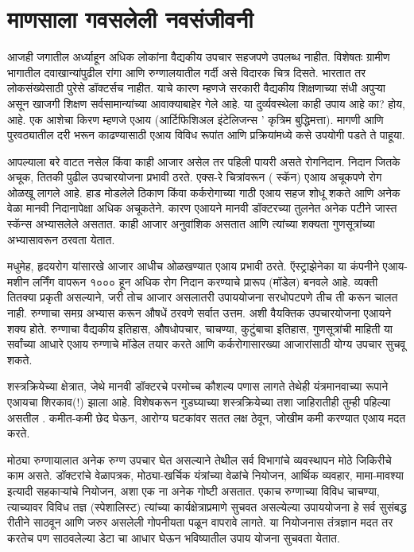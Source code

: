 \chapter{माणसाला गवसलेली नवसंजीवनी}

आजही जगातील अर्ध्याहून अधिक लोकांना वैद्यकीय उपचार सहजपणे उपलब्ध नाहीत. विशेषतः ग्रामीण भागातील दवाखान्यांपुढील रांगा आणि रुग्णालयातील गर्दी असे विदारक चित्र दिसते. भारतात तर लोकसंख्येसाठी पुरेसे डॉक्टर्सच नाहीत. याचे कारण म्हणजे सरकारी वैद्यकीय शिक्षणाच्या संधी अपुऱ्या असून खाजगी शिक्षण सर्वसामान्यांच्या आवाक्याबाहेर गेले आहे. या दुर्व्यवस्थेला काही उपाय आहे का? होय, आहे. एक आशेचा किरण म्हणजे एआय (आर्टिफिशिअल इंटेलिजन्स ' कृत्रिम बुद्धिमत्ता). मागणी आणि पुरवठ्यातील दरी भरून काढण्यासाठी एआय विविध रूपांत आणि प्रक्रियांमध्ये कसे उपयोगी पडते ते पाहूया.

आपल्याला बरे वाटत नसेल किंवा काही आजार असेल तर पहिली पायरी असते रोगनिदान. निदान जितके अचूक, तितकी पुढील उपचारयोजना प्रभावी ठरते. एक्स-रे चित्रांवरून ( स्कॅन) एआय अचूकपणे रोग ओळखू लागले आहे. हाड मोडलेले ठिकाण किंवा कर्करोगाच्या गाठी एआय सहज शोधू शकते आणि अनेक वेळा मानवी निदानापेक्षा अधिक अचूकतेने. कारण एआयने मानवी डॉक्टरच्या तुलनेत अनेक पटीने जास्त स्कॅन्स अभ्यासलेले असतात. काही आजार अनुवांशिक असतात आणि त्यांच्या शक्यता गुणसूत्रांच्या अभ्यासावरून ठरवता येतात.

मधुमेह, हृदयरोग यांसारखे आजार आधीच ओळखण्यात एआय प्रभावी ठरते. ऍस्ट्राझेनेका या कंपनीने एआय-मशीन लर्निंग वापरून १००० हून अधिक रोग निदान करण्याचे प्रारूप (मॉडेल) बनवले आहे. व्यक्ती तितक्या प्रकृती असल्याने, जरी तोच आजार असलातरी उपाययोजना सरधोपटपणे तीच ती करून चालत नाही. रुग्णाचा समग्र अभ्यास करून औषधें ठरवणे सर्वात उत्तम. अशी वैयक्तिक उपचारयोजना एआयने शक्य होते. रुग्णाचा वैद्यकीय इतिहास, औषधोपचार, चाचण्या, कुटुंबाचा इतिहास, गुणसूत्रांची माहिती या सर्वांच्या आधारे एआय रुग्णाचे मॉडेल तयार करते आणि कर्करोगासारख्या आजारांसाठी योग्य उपचार सुचवू शकते.

शस्त्रक्रियेच्या क्षेत्रात, जेथे मानवी डॉक्टरचे परमोच्च कौशल्य पणास लागते तेथेही यंत्रमानवाच्या रूपाने एआयचा शिरकाव(!) झाला आहे. विशेषकरून गुडघ्याच्या शस्त्रक्रियेच्या तशा जाहिरातीही तुम्ही पहिल्या असतील . कमीत-कमी छेद घेऊन, आरोग्य घटकांवर सतत लक्ष ठेवून, जोखीम कमी करण्यात एआय मदत करते.

मोठ्या रुग्णायालात अनेक रुग्ण उपचार घेत असल्याने तेथील सर्व विभागांचे व्यवस्थापन मोठे जिकिरीचे काम असते. डॉक्टरांचे वेळापत्रक, मोठ्या-खर्चिक यंत्रांच्या वेळांचे नियोजन, आर्थिक व्यवहार, मामा-मावश्या इत्यादी सहकाऱ्यांचे नियोजन, अशा एक ना अनेक गोष्टी असतात. एकाच रुग्णाच्या विविध चाचण्या, त्याच्यावर विविध तज्ञ (स्पेशालिस्ट) त्यांच्या कार्यक्षेत्राप्रमाणे सुचवत असल्येल्या उपाययोजना हे सर्व सुसंबद्ध रीतीने साठवून आणि जरुर असलेली गोपनीयता पळून वापरावे लागते. या नियोजनास तंत्रज्ञान मदत तर करतेच पण साठवलेल्या डेटा चा आधार घेऊन भविष्यातील उपाय योजना सुचवता येतात.

